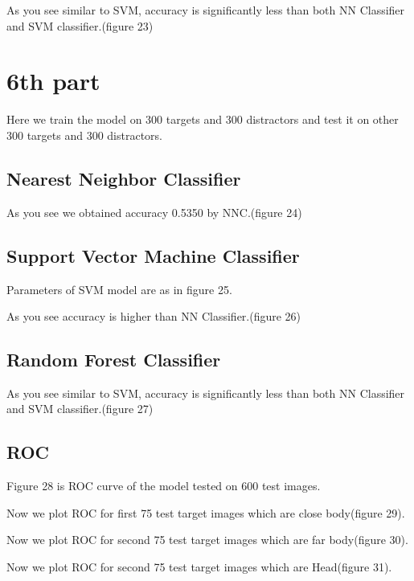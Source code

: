 \documentclass[9pt,twocolumn]{paper-template}
\begin{document}
As you see similar to SVM, accuracy is significantly less than both NN Classifier and  SVM
classifier.(figure 23)



\section*{6th part}


Here we train the model on 300 targets and 300 distractors and test it on other 300 targets and 300 distractors. 


\subsection*{Nearest Neighbor Classifier}




As you see we obtained accuracy 0.5350 by NNC.(figure 24)

\subsection*{Support Vector Machine Classifier}

Parameters of SVM model are as in figure 25.



As you see accuracy is higher than NN Classifier.(figure 26)


\subsection*{Random Forest Classifier}



As you see similar to SVM, accuracy is significantly less than both NN Classifier and  SVM
classifier.(figure 27)



\subsection*{ROC}

Figure 28 is ROC curve of the  model  tested on 600 test images.

Now we plot ROC for first 75 test target images which are close body(figure 29).




Now we plot ROC for second 75 test target images which are far body(figure 30).



Now we plot ROC for second 75 test target images which are Head(figure 31).
\end{document}
